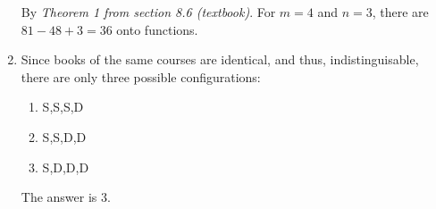 \documentclass[12pt]{article}
\begin{document}
\begin{enumerate}[label=\alph*)]
		By \textit{Theorem 1 from section 8.6 (textbook)}. For $m=4$ and $n=3$, there are $81-48+3=36$ onto functions.
		\begin{comment}For a function $f$ from $A$, $(|A| = 4)$ to $B$, $(|B| = 3)$ to be onto, all elements of $B$ must be \textit{assigned to} a element of $A$. We can first guarantee \textit{being onto} property of $f$, then map the remaining elements of $A$ freely.
		\begin{enumerate}[label=\roman*)]
			\item We need to \textit{assign} three distinct elements of $A$ to three distinct elements of $B$\label{foo}.  %
				\begin{equation}
					P(4,3) = 24
				\end{equation}
			\item We have one \textit{unassigned} element in $A$. Since our criterion is already met, we can \textit{assign} it freely. This can be done in three different ways since $s(B) = 3$\label{bar}.
		\end{enumerate}
		Finally, by \ref{foo} and \ref{bar}, there are $24 \times 3 = 72$ different onto functions by \textbf{product rule}.
		\end{comment}
	\item 
		\begin{comment}The order of the items is irrelevant as what being made is a collection. There are three different cases of such collections being made: 1D (Discrete Mathematics) and 3S (Signals and Systems), 2D and 2S, 3D and 1S. 
		\[\binom{5}{1}\binom{7}{3} + \binom{5}{2}\binom{7}{2} + \binom{5}{3}\binom{7}{1}=455\]
		\end{comment}
		Since books of the same courses are identical, and thus, indistinguisable, there are only three possible configurations: 
		\begin{enumerate}
			\item S,S,S,D
			\item S,S,D,D
			\item S,D,D,D
		\end{enumerate}
		The answer is 3.
\end{enumerate}
\end{document}

